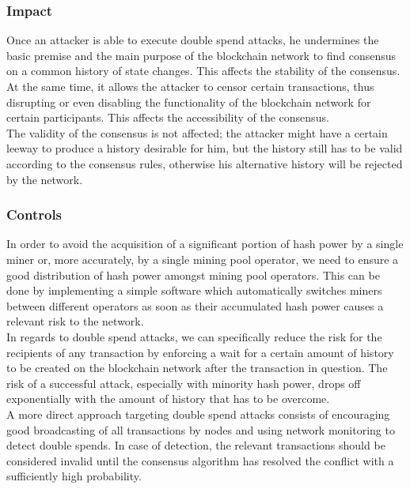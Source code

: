 \documentclass[11pt,a4paper,draft]{article}
\begin{document}
\subsubsection{Impact}

Once an attacker is able to execute double spend attacks, he undermines the basic premise and the main purpose of the blockchain network to find consensus on a common history of state changes. This affects the stability of the consensus.\\

At the same time, it allows the attacker to censor certain transactions, thus disrupting or even disabling the functionality of the blockchain network for certain participants. This affects the accessibility of the consensus.\\

The validity of the consensus is not affected; the attacker might have a certain leeway to produce a history desirable for him, but the history still has to be valid according to the consensus rules, otherwise his alternative history will be rejected by the network.\\

\subsubsection{Controls}

In order to avoid the acquisition of a significant portion of hash power by a single miner or, more accurately, by a single mining pool operator, we need to ensure a good distribution of hash power amongst mining pool operators. This can be done by implementing a simple software which automatically switches miners between different operators as soon as their accumulated hash power causes a relevant risk to the network.\\

In regards to double spend attacks, we can specifically reduce the risk for the recipients of any transaction by enforcing a wait for a certain amount of history to be created on the blockchain network after the transaction in question. The risk of a successful attack, especially with minority hash power, drops off exponentially with the amount of history that has to be overcome.\\

A more direct approach targeting double spend attacks consists of encouraging good broadcasting of all transactions by nodes and using network monitoring to detect double spends. In case of detection, the relevant transactions should be considered invalid until the consensus algorithm has resolved the conflict with a sufficiently high probability.\\
\end{document}

